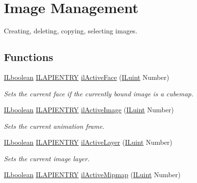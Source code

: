 \hypertarget{group__image__mgt}{\section{Image Management}
\label{group__image__mgt}
}


Creating, deleting, copying, selecting images.  


\subsection*{Functions}
\begin{DoxyCompactItemize}
\item 
\hyperlink{group__il__types_gaa6aa7c95cfdc06b4d8601ef832b7bb0a}{I\+Lboolean} \hyperlink{_i_l_8h_a69c08a8d06df986f7e46f209d131ef2f}{I\+L\+A\+P\+I\+E\+N\+T\+R\+Y} \hyperlink{group__image__mgt_ga77651f86dfb248dddfead0c095ed2c12}{il\+Active\+Face} (\hyperlink{group__il__types_gaff8e86a1072c8d7cfe387fb87c6ed8e1}{I\+Luint} Number)
\begin{DoxyCompactList}\small\item\em Sets the current face if the currently bound image is a cubemap. \end{DoxyCompactList}\item 
\hyperlink{group__il__types_gaa6aa7c95cfdc06b4d8601ef832b7bb0a}{I\+Lboolean} \hyperlink{_i_l_8h_a69c08a8d06df986f7e46f209d131ef2f}{I\+L\+A\+P\+I\+E\+N\+T\+R\+Y} \hyperlink{group__image__mgt_ga1ea5b35280be4128de20e7218108d669}{il\+Active\+Image} (\hyperlink{group__il__types_gaff8e86a1072c8d7cfe387fb87c6ed8e1}{I\+Luint} Number)
\begin{DoxyCompactList}\small\item\em Sets the current animation frame. \end{DoxyCompactList}\item 
\hyperlink{group__il__types_gaa6aa7c95cfdc06b4d8601ef832b7bb0a}{I\+Lboolean} \hyperlink{_i_l_8h_a69c08a8d06df986f7e46f209d131ef2f}{I\+L\+A\+P\+I\+E\+N\+T\+R\+Y} \hyperlink{group__image__mgt_gad362b9264fd40f787f2748237b214f96}{il\+Active\+Layer} (\hyperlink{group__il__types_gaff8e86a1072c8d7cfe387fb87c6ed8e1}{I\+Luint} Number)
\begin{DoxyCompactList}\small\item\em Sets the current image layer. \end{DoxyCompactList}\item 
\hyperlink{group__il__types_gaa6aa7c95cfdc06b4d8601ef832b7bb0a}{I\+Lboolean} \hyperlink{_i_l_8h_a69c08a8d06df986f7e46f209d131ef2f}{I\+L\+A\+P\+I\+E\+N\+T\+R\+Y} \hyperlink{group__image__mgt_ga02171eee15fcaf5fb1d1741307e7f8bc}{il\+Active\+Mipmap} (\hyperlink{group__il__types_gaff8e86a1072c8d7cfe387fb87c6ed8e1}{I\+Luint} Number)

\end{DoxyCompactItemize}
